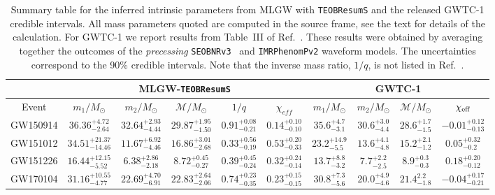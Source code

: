 \begin{table}[t]
\centering
\caption{Summary table for the inferred intrinsic parameters from MLGW with {\tt TEOBResumS} and the released GWTC-1 credible intervals. 
All mass parameters quoted are computed in the source frame, see the text for details of the calculation. For GWTC-1 we report results 
from Table~III  of Ref.~\cite{LigoScientific:2018mvr}. These results were obtained by averaging together the outcomes of the 
{\it precessing} {\tt SEOBNRv3}~\cite{Babak:2016tgq} and {\tt IMRPhenomPv2} waveform models. 
The uncertainties correspond to the 90\% credible intervals.
Note that the inverse mass ratio, $1/q$, is not listed in Ref.~\cite{LIGOScientific:2018mvr}.}
\label{tab:summary}
\begin{ruledtabular}
\begin{tabular}{cccccccccc}
                              & \multicolumn{5}{c}{MLGW-{\tt TEOBResumS}}                                                   & \multicolumn{4}{c|}{GWTC-1}                                                \\ 
                              \hline
Event    & $m_1/M_\odot$ & $m_2/M_\odot$ & $\mathcal{M}/M_\odot$ & $1/q$ & $\chi_{eff}$ & $m_1/M_\odot$ & $m_2/M_\odot$ & $\mathcal{M}/M_\odot$ & $\chi_{\rm eff}$
\\ \hline
\vspace{1.0 mm}
GW150914 & $36.36_{-2.64}^{+4.72}$& $32.64_{-4.44}^{+2.93}$& $29.87_{-1.50}^{+1.95}$& $0.91_{-0.21}^{+0.08}$& $0.14_{-0.10}^{+0.10}$&    $35.6_{-3.1}^{+4.7}$           &   $30.6_{-4.4}^{+3.0}$            & $28.6_{-1.5}^{+1.7}$                      & $-0.01_{-0.13}^{+0.12}$              \\
\vspace{1.0 mm}
GW151012 & $34.51_{-14.46}^{+21.37}$& $11.67_{-4.46}^{+6.92}$& $16.86_{-2.68}^{+3.01}$& $0.33_{-0.19}^{+0.56}$& $0.53_{-0.33}^{+0.20}$&   $23.2_{-5.5}^{+14.9}$            &   $13.6_{-4.8}^{+4.1}$            &  $15.2_{-1.2}^{+2.1}$                     &  $0.05_{-0.2}^{+0.32}$              \\
\vspace{1.0 mm}
GW151226 & $16.44_{-5.52}^{+12.15}$& $6.38_{-2.18}^{+2.86}$& $8.72_{-0.27}^{+0.45}$& $0.39_{-0.24}^{+0.45}$& $0.32_{-0.14}^{+0.24}$&   $13.7_{-3.2}^{+8.8}$            & $7.7_{-2.5}^{+2.2}$               &  $8.9_{-0.3}^{+0.3}$                     & $0.18_{-0.12}^{+0.20}$              \\
\vspace{1.0 mm}
GW170104 & $31.16_{-4.77}^{+10.55}$& $22.69_{-6.91}^{+4.70}$& $22.83_{-2.06}^{+2.64}$& $0.74_{-0.35}^{+0.23}$& $0.23_{-0.15}^{+0.15}$&  $30.8_{-5.6}^{+7.3}$             & $20.0_{-4.6}^{+4.9}$              & $21.4_{-1.8}^{2.2}$                       &  $-0.04_{-0.21}^{+0.17}$             \\

\end{tabular}
\end{ruledtabular}
\end{table}
